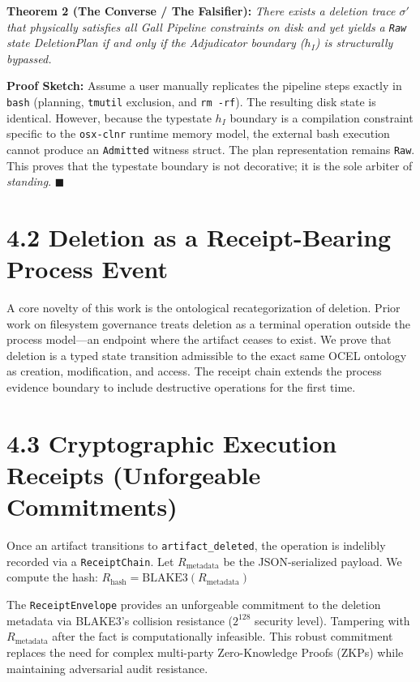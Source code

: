 \documentclass[
  12pt,
]{report}
\begin{document}
\textbf{Theorem 2 (The Converse / The Falsifier):} \emph{There exists a
deletion trace \(\sigma'\) that physically satisfies all Gall Pipeline
constraints on disk and yet yields a \texttt{Raw} state DeletionPlan if
and only if the Adjudicator boundary (\(h_I\)) is structurally
bypassed.}

\textbf{Proof Sketch:} Assume a user manually replicates the pipeline
steps exactly in \texttt{bash} (planning, \texttt{tmutil} exclusion, and
\texttt{rm\ -rf}). The resulting disk state is identical. However,
because the typestate \(h_I\) boundary is a compilation constraint
specific to the \texttt{osx-clnr} runtime memory model, the external
bash execution cannot produce an \texttt{Admitted} witness struct. The
plan representation remains \texttt{Raw}. This proves that the typestate
boundary is not decorative; it is the sole arbiter of \emph{standing}.
\(\blacksquare\)

\section{4.2 Deletion as a Receipt-Bearing Process
Event}\label{deletion-as-a-receipt-bearing-process-event}

A core novelty of this work is the ontological recategorization of
deletion. Prior work on filesystem governance treats deletion as a
terminal operation outside the process model---an endpoint where the
artifact ceases to exist. We prove that deletion is a typed state
transition admissible to the exact same OCEL ontology as creation,
modification, and access. The receipt chain extends the process evidence
boundary to include destructive operations for the first time.

\section{4.3 Cryptographic Execution Receipts (Unforgeable
Commitments)}\label{cryptographic-execution-receipts-unforgeable-commitments}

Once an artifact transitions to \texttt{artifact\_deleted}, the
operation is indelibly recorded via a \texttt{ReceiptChain}. Let
\(R_{\text{metadata}}\) be the JSON-serialized payload. We compute the
hash: \(R_{\text{hash}} = \text{BLAKE3}(R_{\text{metadata}})\)

The \texttt{ReceiptEnvelope} provides an unforgeable commitment to the
deletion metadata via BLAKE3's collision resistance (\(2^{128}\)
security level). Tampering with \(R_{\text{metadata}}\) after the fact
is computationally infeasible. This robust commitment replaces the need
for complex multi-party Zero-Knowledge Proofs (ZKPs) while maintaining
adversarial audit resistance.
\end{document}
